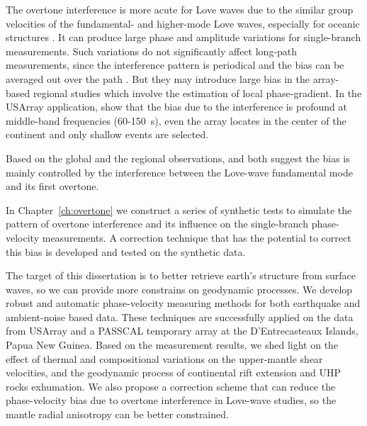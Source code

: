 \documentclass[12pt,oneside]{book}
\begin{document}
The overtone interference is more acute for Love waves due to the similar group velocities of the fundamental- and higher-mode Love waves, especially for oceanic structures \citep{Nettles:2011bb}. It can produce large phase and amplitude variations for single-branch measurements.  
Such variations do not significantly affect long-path measurements, since the interference pattern is periodical and the bias can be averaged out over the path \citep{Nettles:2011bb}. But they may introduce large bias in the array-based regional studies which involve the estimation of local phase-gradient. In the USArray application, \citet{Foster:2014kr} show that the bias due to the interference is profound at middle-band frequencies (60-150~s), even the array locates in the center of the continent and only shallow events are selected. 

Based on the global and the regional observations, \citet{Nettles:2011bb} and \citet{Foster:2014kr} both suggest the bias is mainly controlled by the interference between the Love-wave fundamental mode and its first overtone.

In Chapter~\ref{ch:overtone} we construct a series of synthetic tests to simulate the pattern of overtone interference and its influence on the single-branch phase-velocity measurements. A correction technique that has the potential to correct this bias is developed and tested on the synthetic data.

The target of this dissertation is to better retrieve earth's structure from surface waves, so we can provide more constrains on geodynamic processes. 
We develop robust and automatic phase-velocity measuring methods for both earthquake and ambient\nobreakdash-noise based data. These techniques are successfully applied on the data from USArray and a PASSCAL temporary array at the D'Entrecasteaux Islands, Papua New Guinea. 
Based on the measurement results, we shed light on the effect of thermal and compositional variations on the upper-mantle shear velocities, and the geodynamic process of continental rift extension and UHP rocks exhumation.
We also propose a correction scheme that can reduce the phase-velocity bias due to overtone interference in Love-wave studies, so the mantle radial anisotropy can be better constrained.

\raggedbottom
\pagebreak

\singlespacing
\end{document}
